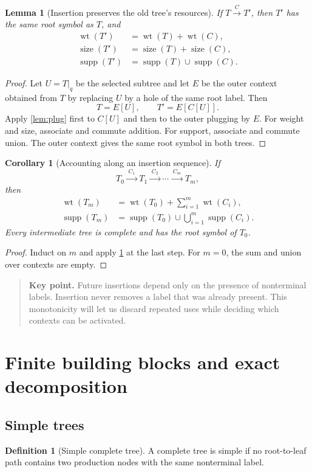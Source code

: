 \documentclass[11pt,a4paper]{article}
\numberwithin{equation}{section}
\theoremstyle{plain}
\newtheorem{lemma}[theorem]{Lemma}
\newtheorem{corollary}[theorem]{Corollary}
\theoremstyle{definition}
\newtheorem{definition}[theorem]{Definition}
\theoremstyle{remark}
\newcommand{\wt}{\operatorname{wt}}
\newcommand{\supp}{\operatorname{supp}}
\newcommand{\sz}{\operatorname{size}}
\newcommand{\ins}[1]{\xrightarrow{\;#1\;}}
\newcommand{\key}[1]{\begin{quote}\small\color{ink}\textbf{Key point.} #1\end{quote}}
\begin{document}
\begin{lemma}[Insertion preserves the old tree's resources]\label{lem:insertion-laws}
If $T\ins C T'$, then $T'$ has the same root symbol as $T$, and
\begin{align}
\wt(T')&=\wt(T)+\wt(C),\label{eq:insert-wt}\\
\sz(T')&=\sz(T)+\sz(C),\label{eq:insert-size}\\
\supp(T')&=\supp(T)\cup\supp(C).\label{eq:insert-supp}
\end{align}
\end{lemma}
\begin{proof}
Let $U=T|_q$ be the selected subtree and let $E$ be the outer context obtained from $T$ by replacing $U$ by a hole of the same root label. Then
\[
T=E[U],\qquad T'=E[C[U]].
\]
Apply \cref{lem:plug} first to $C[U]$ and then to the outer plugging by $E$. For weight and size, associate and commute addition. For support, associate and commute union. The outer context gives the same root symbol in both trees.
\end{proof}

\begin{corollary}[Accounting along an insertion sequence]\label{cor:sequence}
If
\[
T_0\ins{C_1}T_1\ins{C_2}\cdots\ins{C_m}T_m,
\]
then
\begin{align*}
\wt(T_m)&=\wt(T_0)+\sum_{i=1}^m\wt(C_i),\\
\supp(T_m)&=\supp(T_0)\cup\bigcup_{i=1}^m\supp(C_i).
\end{align*}
Every intermediate tree is complete and has the root symbol of $T_0$.
\end{corollary}
\begin{proof}
Induct on $m$ and apply \cref{lem:insertion-laws} at the last step. For $m=0$, the sum and union over contexts are empty.
\end{proof}

\key{Future insertions depend only on the presence of nonterminal labels. Insertion never removes a label that was already present. This monotonicity will let us discard repeated uses while deciding which contexts can be activated.}

\section{Finite building blocks and exact decomposition}\label{sec:decomposition}

\subsection{Simple trees}
\begin{definition}[Simple complete tree]
A complete tree is simple if no root-to-leaf path contains two production nodes with the same nonterminal label.
\end{definition}
\end{document}
